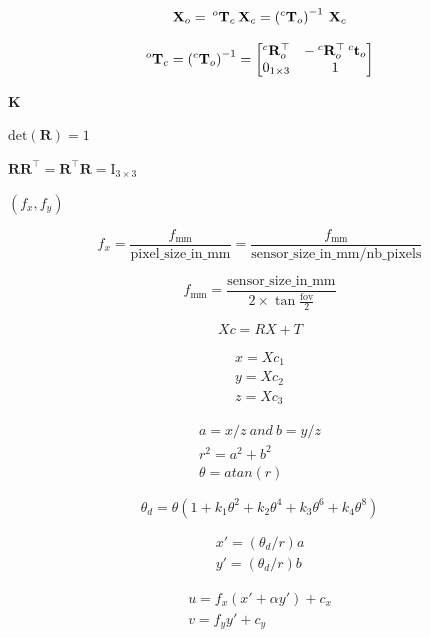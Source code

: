 \documentclass{article}
\begin{document}
\[\mathbf{X}_o = \hspace{0.2em}
{}^{o}\mathbf{T}_c \hspace{0.2em} \mathbf{X}_c =
\left( {}^{c}\mathbf{T}_o \right)^{-1} \hspace{0.2em} \mathbf{X}_c
\]
\pagebreak

\[{}^{o}\mathbf{T}_c = \left( {}^{c}\mathbf{T}_o \right)^{-1} =
\begin{bmatrix}
{}^{c}\mathbf{R}^{\top}_o & - \hspace{0.2em} {}^{c}\mathbf{R}^{\top}_o \hspace{0.2em} {}^{c}\mathbf{t}_o \\
0_{1 \times 3} & 1
\end{bmatrix}
\]
\pagebreak

$ \mathbf{K} $
\pagebreak

$ \mathrm{det} \left( \mathbf{R} \right) = 1 $
\pagebreak

$ \mathbf{R} \mathbf{R}^{\top} = \mathbf{R}^{\top} \mathbf{R} = \mathrm{I}_{3 \times 3} $
\pagebreak

$ \left(f_x, f_y \right) $
\pagebreak

\[f_x = \frac{f_{\text{mm}}}{\text{pixel_size_in_mm}} = \frac{f_{\text{mm}}}{\text{sensor_size_in_mm} / \text{nb_pixels}}
\]
\pagebreak

\[f_{\text{mm}} = \frac{\text{sensor_size_in_mm}}{2 \times \tan{\frac{\text{fov}}{2}}}
\]
\pagebreak

\[Xc = R X + T\]
\pagebreak

\[\begin{array}{l} x = Xc_1 \\ y = Xc_2 \\ z = Xc_3 \end{array} \]
\pagebreak

\[\begin{array}{l} a = x / z \ and \ b = y / z \\ r^2 = a^2 + b^2 \\ \theta = atan(r) \end{array} \]
\pagebreak

\[\theta_d = \theta (1 + k_1 \theta^2 + k_2 \theta^4 + k_3 \theta^6 + k_4 \theta^8)\]
\pagebreak

\[\begin{array}{l} x' = (\theta_d / r) a \\ y' = (\theta_d / r) b \end{array} \]
\pagebreak

\[\begin{array}{l} u = f_x (x' + \alpha y') + c_x \\
    v = f_y y' + c_y \end{array} \]
\pagebreak
\end{document}
